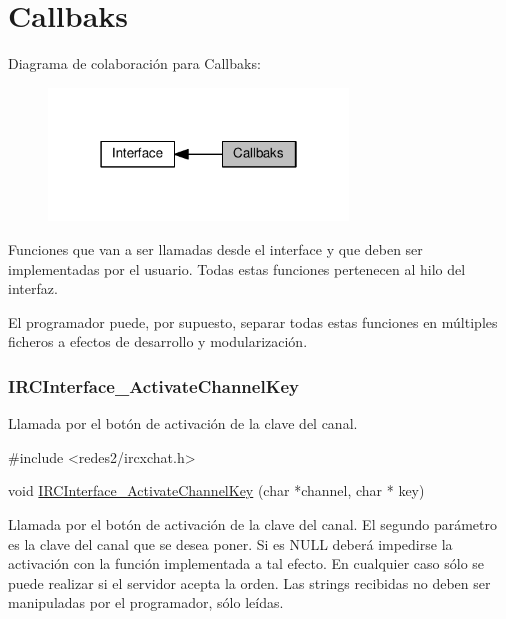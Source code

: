 \hypertarget{group__IRCInterfaceCallbacks}{}\section{Callbaks}
\label{group__IRCInterfaceCallbacks}
Diagrama de colaboración para Callbaks\+:\nopagebreak
\begin{figure}[H]
\begin{center}
\leavevmode
\includegraphics[width=226pt]{group__IRCInterfaceCallbacks}
\end{center}
\end{figure}
Funciones que van a ser llamadas desde el interface y que deben ser implementadas por el usuario. Todas estas funciones pertenecen al hilo del interfaz.

El programador puede, por supuesto, separar todas estas funciones en múltiples ficheros a efectos de desarrollo y modularización.



 \hypertarget{IRCInterface_ActivateChannelKey}{}\subsubsection{I\+R\+C\+Interface\+\_\+\+Activate\+Channel\+Key}\label{IRCInterface_ActivateChannelKey}
Llamada por el botón de activación de la clave del canal.


\begin{DoxyCode}
\textcolor{preprocessor}{#include <redes2/ircxchat.h>}

\textcolor{keywordtype}{void} \hyperlink{G-2313-06-P2__client_8c_a33f80a29a744e4182b29e23f13c1f05c}{IRCInterface\_ActivateChannelKey} (\textcolor{keywordtype}{char} *channel, \textcolor{keywordtype}{char} * key)
\end{DoxyCode}


Llamada por el botón de activación de la clave del canal. El segundo parámetro es la clave del canal que se desea poner. Si es N\+U\+LL deberá impedirse la activación con la función implementada a tal efecto. En cualquier caso sólo se puede realizar si el servidor acepta la orden. Las strings recibidas no deben ser manipuladas por el programador, sólo leídas.


